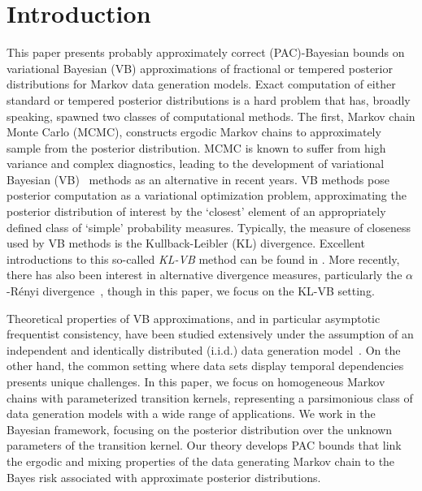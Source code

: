 \documentclass[11pt]{amsart}
\begin{document}
\section{Introduction}
This paper presents probably approximately correct (PAC)-Bayesian bounds on variational Bayesian (VB) approximations of fractional or tempered posterior distributions for Markov data generation models. Exact computation of either standard or tempered posterior distributions is a hard problem that has, broadly speaking, spawned two classes of computational methods. The first, Markov chain Monte Carlo (MCMC), constructs ergodic Markov chains to approximately sample from the posterior distribution. MCMC is known to suffer from high variance and complex diagnostics, leading to the development of variational Bayesian (VB)~\cite{jordan} methods as an alternative in recent years. 
VB methods pose posterior computation as a variational optimization problem, approximating the posterior distribution of interest by the `closest' element of an appropriately defined class of `simple' probability measures. 
Typically, the measure of closeness used by VB methods is the Kullback-Leibler (KL) divergence. 
Excellent introductions to this so-called {\it KL-VB} method can be found in \cite{bishop,ormerod,blei}. More recently, there has also been interest in alternative divergence measures, particularly the $\alpha$-R\'enyi divergence~\cite{prateek2,li2016renyi, dieng2017variational}, though in this paper, we focus on the KL-VB setting.

 Theoretical properties of VB approximations, and in particular asymptotic frequentist consistency, have been studied extensively under the assumption of an independent and identically distributed (i.i.d.) data generation model~\cite{blei,blei1,zhang}. On the other hand, the common setting where data sets display temporal dependencies presents unique challenges. In this paper, we focus on homogeneous Markov chains with parameterized transition kernels, representing a parsimonious class of data generation models with a wide range of applications.  
We work in the Bayesian framework, focusing on the posterior distribution over the unknown parameters of the transition kernel.
Our theory develops PAC bounds that link the ergodic and mixing properties of the data generating Markov chain to the Bayes risk associated with approximate posterior distributions.
\end{document}
